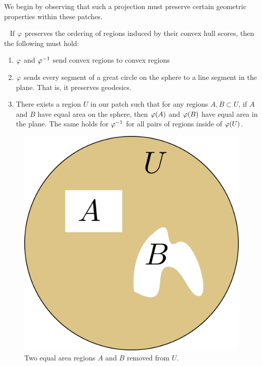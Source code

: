 We begin by observing that such a projection must preserve certain geometric properties within these patches.
\begin{lemma}~\label{lem:CH_prep}
	If $\varphi$ preserves the ordering of regions induced by their convex hull scores, then the following must 
	hold:
	\begin{enumerate}
		\item $\varphi$ and $\varphi^{-1}$ send convex regions to convex regions
		\item $\varphi$ sends every segment of a great circle on the sphere to a line segment in the plane.  That is, it preserves geodesics.
		\item There exists a region $U$ in our patch
		such that for any regions $A,B\subset U$, if 
		$A$ and $B$ have equal area on the sphere, then 
		$\varphi(A)$ and $\varphi(B)$ have equal area in the plane.  The same holds 
		for $\varphi^{-1}$ for all pairs of regions inside of $\varphi(U)$.
	\end{enumerate}
\end{lemma}

\begin{figure}[h]
	\centering
	\includegraphics[width=.25\textwidth]{figs/ch_sphere_schema.png}
	\caption{Two equal area regions $A$ and $B$ removed from $U$.}
	\label{fig:ch_schema}
\end{figure}



